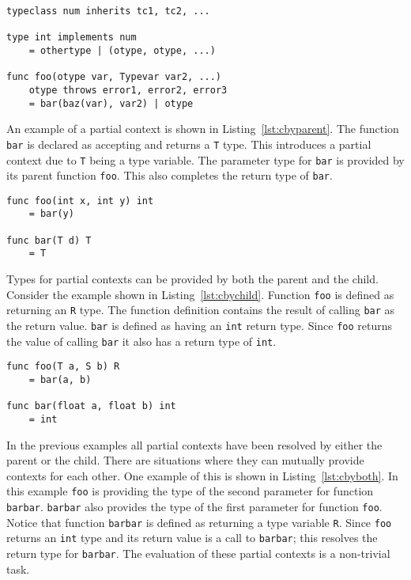 \documentclass{acm_proc_article-sp}
\begin{document}
\begin{lstlisting}[caption=Grammar displayed informally,language=Paratype,label=lst:informalg]
typeclass num inherits tc1, tc2, ...

type int implements num
    = othertype | (otype, otype, ...)

func foo(otype var, Typevar var2, ...)
    otype throws error1, error2, error3
    = bar(baz(var), var2) | otype
\end{lstlisting}

An example of a partial context is shown in Listing~\ref{lst:cbyparent}. The
function \lstinline!bar! is declared as accepting and returns a \lstinline!T!
type.  This introduces a partial context due to \lstinline!T! being a type
variable. The parameter type for \lstinline!bar! is provided by its parent
function \lstinline!foo!. This also completes the return type of
\lstinline!bar!.

\begin{lstlisting}[caption=Explicit context provided by parents,language=Paratype,label=lst:cbyparent]
func foo(int x, int y) int
    = bar(y)

func bar(T d) T
    = T
\end{lstlisting}

Types for partial contexts can be provided by both the parent and the child.
Consider the example shown in Listing~\ref{lst:cbychild}. Function
\lstinline!foo!  is defined as returning an \lstinline!R! type. The function
definition contains the result of calling \lstinline!bar! as the return value.
\lstinline!bar! is defined as having an \lstinline!int! return type. Since
\lstinline!foo! returns the value of calling \lstinline!bar! it also has a
return type of \lstinline!int!.

\begin{lstlisting}[caption=Explicit context provided by child,language=Paratype,label=lst:cbychild]
func foo(T a, S b) R
    = bar(a, b)

func bar(float a, float b) int
    = int
\end{lstlisting}

In the previous examples all partial contexts have been resolved by either the
parent or the child. There are situations where they can mutually provide
contexts for each other. One example of this is shown in
Listing~\ref{lst:cbyboth}. In this example \lstinline!foo! is providing
the type of the second parameter for function \lstinline!barbar!.
\lstinline!barbar!  also provides the type of the first parameter for function
\lstinline!foo!. Notice that function \lstinline!barbar! is defined as
returning a type variable \lstinline!R!. Since \lstinline!foo! returns an
\lstinline!int! type and its return value is a call to \lstinline!barbar!; this
resolves the return type for \lstinline!barbar!. The evaluation of these
partial contexts is a non-trivial task.
\end{document}
